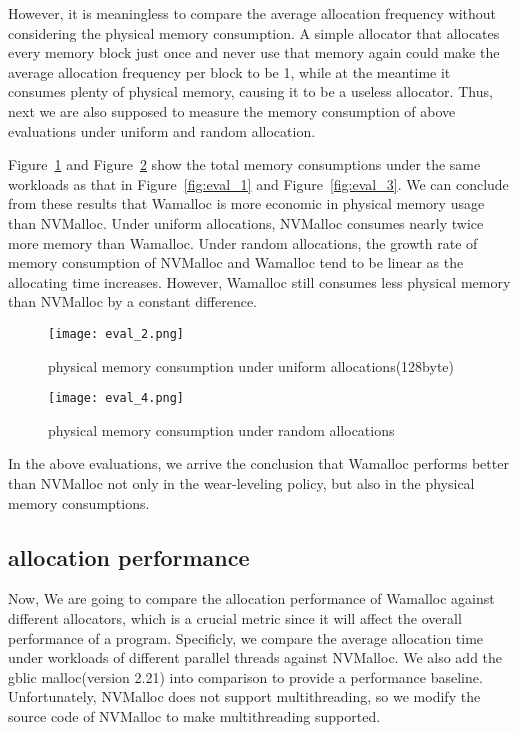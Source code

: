 \documentclass{vldb}
\begin{document}
However, it is meaningless to compare the average allocation frequency without considering the physical memory consumption.
A simple allocator that allocates every memory block just once and never use that memory again 
could make the average allocation frequency per block to be 1, 
while at the meantime it consumes plenty of physical memory, causing it to be a useless allocator.
Thus, next we are also supposed to measure the memory consumption of above evaluations under uniform and random allocation.

Figure~\ref{fig:eval_2} and Figure~\ref{fig:eval_4} show the total memory consumptions under the same workloads as that in Figure~\ref{fig:eval_1} and Figure~\ref{fig:eval_3}.
We can conclude from these results that 
Wamalloc is more economic in physical memory usage than NVMalloc.
Under uniform allocations, NVMalloc consumes nearly twice more memory than Wamalloc.
Under random allocations, the growth rate of memory consumption of NVMalloc and Wamalloc tend to be linear as the allocating time increases. 
However, Wamalloc still consumes less physical memory than NVMalloc by a constant difference.

\begin{figure}[t]
\centering
\texttt{[image: eval\_2.png]}
\caption{physical memory consumption under uniform allocations(128byte)}
\label{fig:eval_2}
\end{figure}

\begin{figure}[t]
\centering
\texttt{[image: eval\_4.png]}
\caption{physical memory consumption under random allocations}
\label{fig:eval_4}
\end{figure}

In the above evaluations, we arrive the conclusion that
Wamalloc performs better than NVMalloc not only in the wear-leveling policy,
but also in the physical memory consumptions.

\subsection{allocation performance}

Now, We are going to compare the allocation performance of Wamalloc against different allocators,
which is a crucial metric since it will affect the overall performance of a program.
Specificly, we compare the average allocation time under workloads of different parallel threads against NVMalloc.
We also add the gblic malloc(version 2.21) into comparison to provide a performance baseline.
Unfortunately, NVMalloc does not support multithreading,
so we modify the source code of NVMalloc to make multithreading supported.
\end{document}
